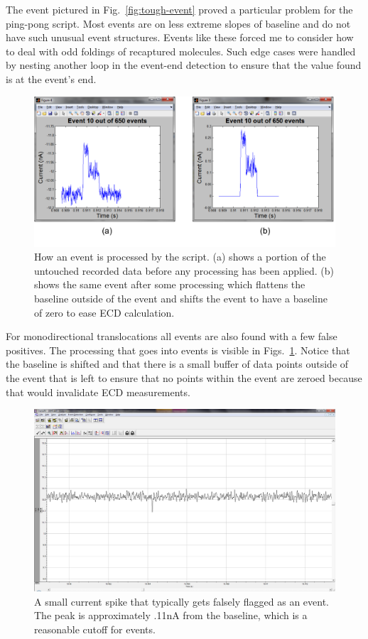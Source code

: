 \documentclass[aps,prl,preprint,groupedaddress]{revtex4}
\begin{document}
The event pictured in Fig.~\ref{fig:tough-event} proved a particular problem for the ping-pong script.
Most events are on less extreme slopes of baseline and do not have such unusual event structures.
Events like these forced me to consider how to deal with odd foldings of recaptured molecules.
Such edge cases were handled by nesting another loop in the event-end detection to ensure that the value found is at the event's end.

\begin{figure}[H]
\centering
\includegraphics[width=1\textwidth]{figures/event-processing}
\caption{How an event is processed by the script. (a) shows a portion of the untouched recorded data before any processing has been applied.
(b) shows the same event after some processing which flattens the baseline outside of the event and shifts the event to have a baseline of zero to ease ECD calculation.}
\label{fig:event-analysis}
\end{figure}

For monodirectional translocations all events are also found with a few false positives.
The processing that goes into events is visible in Figs.~\ref{fig:event-analysis}.
Notice that the baseline is shifted and that there is a small buffer of data points outside of the event that is left to ensure that no points within the event are zeroed because that would invalidate ECD measurements.

\begin{figure}[H]
\centering
\includegraphics[width=1\textwidth]{figures/false-positive-example}
\caption{A small current spike that typically gets falsely flagged as an event.
The peak is approximately .11nA from the baseline, which is a reasonable cutoff for events.}
\label{fig:spike}
\end{figure}
\end{document}
